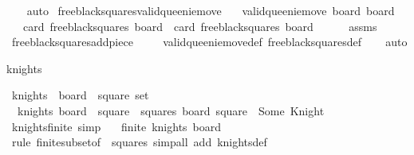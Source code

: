 \begin{isabellebody}
\ \ \isamarkupfalse%
\ auto%
\endisatagproof
{\isafoldproof}%
%
\isadelimproof
\isanewline
%
\endisadelimproof
\isanewline
{}\isamarkupfalse%
\ free{\isacharunderscore}black{\isacharunderscore}squares{\isacharunderscore}valid{\isacharunderscore}queenie{\isacharunderscore}move{\isacharcolon}\isanewline
\ \ \ {\isachardoublequoteopen}valid{\isacharunderscore}queenie{\isacharunderscore}move\ board\ board{\isacharprime}{\isachardoublequoteclose}\isanewline
\ \ \ {\isachardoublequoteopen}card\ {\isacharparenleft}free{\isacharunderscore}black{\isacharunderscore}squares\ board{\isacharparenright}\ {\isasymle}\ card\ {\isacharparenleft}free{\isacharunderscore}black{\isacharunderscore}squares\ board{\isacharprime}{\isacharparenright}\ {\isacharplus}\ {}{\isachardoublequoteclose}\isanewline
%
\isadelimproof
\ \ %
\endisadelimproof
%
\isatagproof
{}\isamarkupfalse%
\ assms\isanewline
\ \ \isamarkupfalse%
\ free{\isacharunderscore}black{\isacharunderscore}squares{\isacharunderscore}add{\isacharunderscore}piece\ \isanewline
\ \ \isamarkupfalse%
\ valid{\isacharunderscore}queenie{\isacharunderscore}move{\isacharunderscore}def\ free{\isacharunderscore}black{\isacharunderscore}squares{\isacharunderscore}def\isanewline
\ \ \isamarkupfalse%
\ auto%
\endisatagproof
{\isafoldproof}%
%
\isadelimproof
%
\endisadelimproof
%
\begin{isamarkuptext}%
knights%
\end{isamarkuptext}\isamarkuptrue%
\isamarkupfalse%
\ knights\ {\isacharcolon}{\isacharcolon}\ {\isachardoublequoteopen}board\ {\isasymRightarrow}\ square\ set{\isachardoublequoteclose}\ \isanewline
\ \ {\isachardoublequoteopen}knights\ board\ {\isacharequal}\ {\isacharbraceleft}square\ {\isasymin}\ squares{\isachardot}\ board\ square\ {\isacharequal}\ Some\ Knight{\isacharbraceright}{\isachardoublequoteclose}\isanewline
\isanewline
{}\isamarkupfalse%
\ knights{\isacharunderscore}finite\ {\isacharbrackleft}simp{\isacharbrackright}{\isacharcolon}\isanewline
\ \ \ {\isachardoublequoteopen}finite\ {\isacharparenleft}knights\ board{\isacharparenright}{\isachardoublequoteclose}\isanewline
%
\isadelimproof
\ \ %
\endisadelimproof
%
\isatagproof
{}\isamarkupfalse%
\ {\isacharparenleft}rule\ finite{\isacharunderscore}subset{\isacharbrackleft}of\ {\isacharunderscore}\ squares{\isacharbrackright}{\isacharcomma}\ simp{\isacharunderscore}all\ add{\isacharcolon}\ knights{\isacharunderscore}def{\isacharparenright}%

\end{isabellebody}
